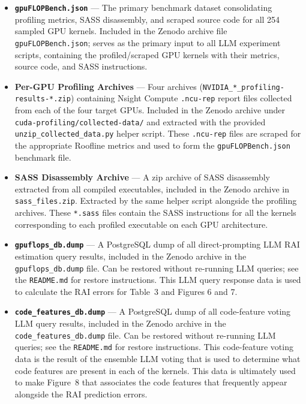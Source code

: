 \documentclass[conference]{IEEEtran}
\begin{document}
\begin{itemize}
    \item \textbf{\texttt{gpuFLOPBench.json}} --- The primary benchmark dataset consolidating profiling metrics, SASS disassembly, and scraped source code for all 254 sampled GPU kernels.
    Included in the Zenodo archive file \texttt{gpuFLOPBench.json}; serves as the primary input to all LLM experiment scripts, containing the profiled/scraped GPU kernels with their metrics, source code, and SASS instructions.

    \item \textbf{Per-GPU Profiling Archives} --- Four archives (\texttt{NVIDIA\_*\_profiling-results-*.zip}) containing Nsight Compute \texttt{.ncu-rep} report files collected from each of the four target GPUs.
    Included in the Zenodo archive under \texttt{cuda-profiling/collected-data/} and extracted with the provided \texttt{unzip\_collected\_data.py} helper script.
    These \texttt{.ncu-rep} files are scraped for the appropriate Roofline metrics and used to form the \texttt{gpuFLOPBench.json} benchmark file.

    \item \textbf{SASS Disassembly Archive} --- A zip archive of SASS disassembly extracted from all compiled executables, included in the Zenodo archive in \texttt{sass\_files.zip}.
    Extracted by the same helper script alongside the profiling archives.
    These \texttt{*.sass} files contain the SASS instructions for all the kernels corresponding to each profiled executable on each GPU architecture.

    \item \textbf{\texttt{gpuflops\_db.dump}} --- A PostgreSQL dump of all direct-prompting LLM RAI estimation query results, included in the Zenodo archive in the \texttt{gpuflops\_db.dump} file.
    Can be restored without re-running LLM queries; see the \texttt{README.md} for restore instructions.
    This LLM query response data is used to calculate the RAI errors for Table~3 and Figures 6 and 7.

    \item \textbf{\texttt{code\_features\_db.dump}} --- A PostgreSQL dump of all code-feature voting LLM query results, included in the Zenodo archive in the \texttt{code\_features\_db.dump} file.
    Can be restored without re-running LLM queries; see the \texttt{README.md} for restore instructions.
    This code-feature voting data is the result of the ensemble LLM voting that is used to determine what code features are present in each of the kernels.
    This data is ultimately used to make Figure~8 that associates the code features that frequently appear alongside the RAI prediction errors.


\end{itemize}
\end{document}
